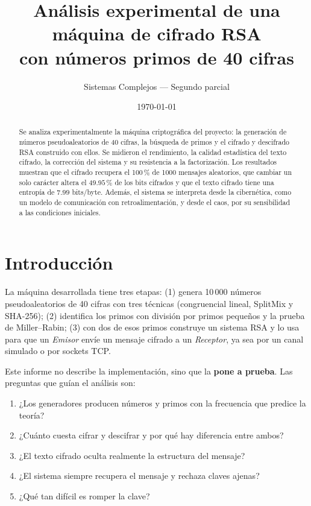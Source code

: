 \documentclass[11pt,a4paper]{article}
\title{Análisis experimental de una máquina de cifrado RSA\\
con números primos de 40 cifras}
\author{Sistemas Complejos --- Segundo parcial}
\date{\today}
\begin{document}
\maketitle

\begin{abstract}
Se analiza experimentalmente la máquina criptográfica del proyecto: la generación
de números pseudoaleatorios de 40 cifras, la búsqueda de primos y el cifrado y
descifrado RSA construido con ellos. Se midieron el rendimiento, la calidad
estadística del texto cifrado, la corrección del sistema y su resistencia a la
factorización. Los resultados muestran que el cifrado recupera el 100\,\% de
1000 mensajes aleatorios, que cambiar un solo carácter altera el
$49.95$\,\% de los bits cifrados y que el texto cifrado tiene una entropía de
$7.99$ bits/byte. Además, el sistema se interpreta desde la cibernética, como un
modelo de comunicación con retroalimentación, y desde el caos, por su
sensibilidad a las condiciones iniciales.
\end{abstract}

\section{Introducción}

La máquina desarrollada tiene tres etapas: (1) genera 10\,000 números
pseudoaleatorios de 40 cifras con tres técnicas (congruencial lineal,
SplitMix y SHA-256); (2) identifica los primos con división por primos
pequeños y la prueba de Miller--Rabin; (3) con dos de esos primos construye un
sistema RSA y lo usa para que un \emph{Emisor} envíe un mensaje cifrado a un
\emph{Receptor}, ya sea por un canal simulado o por sockets TCP.

Este informe no describe la implementación, sino que la \textbf{pone a prueba}.
Las preguntas que guían el análisis son:
\begin{enumerate}
  \item ¿Los generadores producen números y primos con la frecuencia que
        predice la teoría?
  \item ¿Cuánto cuesta cifrar y descifrar y por qué hay diferencia entre ambos?
  \item ¿El texto cifrado oculta realmente la estructura del mensaje?
  \item ¿El sistema siempre recupera el mensaje y rechaza claves ajenas?
  \item ¿Qué tan difícil es romper la clave?
\end{enumerate}
\end{document}
